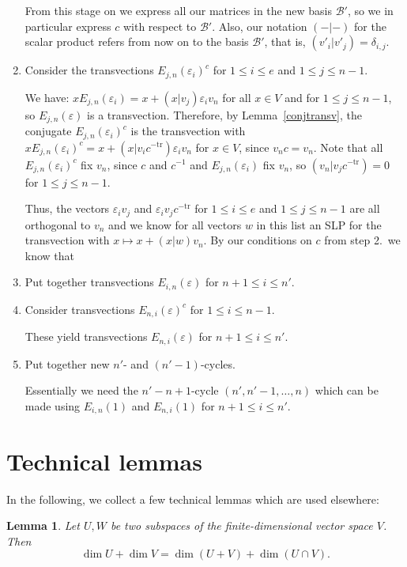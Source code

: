\documentclass[a4paper,11pt]{article}
\newcommand{\tr}{\mathrm{tr}}
\newcommand{\B}{\mathcal{B}}
\newtheorem{lemma}{Lemma}
\begin{document}
\begin{enumerate}
From this stage on we express all our matrices in the new basis $\B'$,
so we in particular express $c$ with respect to $\B'$.
Also, our notation $(-|-)$ for the scalar product refers from now on
to the basis $\B'$, that is, $(v'_i | v'_j) = \delta_{i,j}$.
\item Consider the transvections $E_{j,n}(\varepsilon_i)^c$ 
for $1 \le i \le e$ and $1 \le j \le n-1$.

We have: $xE_{j,n}(\varepsilon_i) = x + (x|v_j) \varepsilon_i v_n$ 
for all $x \in V$
and for $1 \le j \le n-1$, so $E_{j,n}(\varepsilon)$ is a transvection.
Therefore, by Lemma~\ref{conjtransv}, 
the conjugate $E_{j,n}(\varepsilon_i)^c$ is the transvection
with $xE_{j,n}(\varepsilon_i)^c = x + (x|v_ic^{-\tr})\varepsilon_i v_n$ 
for $x \in V$, since $v_nc = v_n$. Note that all
$E_{j,n}(\varepsilon_i)^c$ fix $v_n$, since $c$ and $c^{-1}$ and
$E_{j,n}(\varepsilon_i)$ fix $v_n$, so $(v_n|v_jc^{-\tr}) = 0$ for $1 \le
j \le n-1$.

Thus, the vectors $\varepsilon_i v_j$ and $\varepsilon_i v_j c^{-\tr}$
for $1 \le i \le e$ and $1 \le j \le n-1$
are all orthogonal to $v_n$ and we know for all 
vectors $w$ in this list an SLP for the transvection with
$x \mapsto x + (x|w)v_n$. By our conditions on $c$ from step 2.~we know
that 

\item Put together transvections $E_{i,n}(\varepsilon)$ for $n+1 \le i \le n'$.
\item Consider transvections $E_{n,i}(\varepsilon)^c$ for $1 \le i \le n-1$.

These yield transvections $E_{n,i}(\varepsilon)$ for $n+1 \le i \le n'$.

\item Put together new $n'$- and $(n'-1)$-cycles.

Essentially we need the $n'-n+1$-cycle $(n',n'-1, \ldots, n)$ which can 
be made using $E_{i,n}(1)$ and $E_{n,i}(1)$ for $n+1 \le i \le n'$.
\end{enumerate}

\section{Technical lemmas}

In the following, we collect a few technical lemmas which are used
elsewhere:

\begin{lemma}
\label{dimformula}
Let $U,W$ be two subspaces of the finite-dimensional vector space $V$.
Then
\[ \dim U + \dim V = \dim(U+V) + \dim(U \cap V). \]
\end{lemma}
\end{document}
